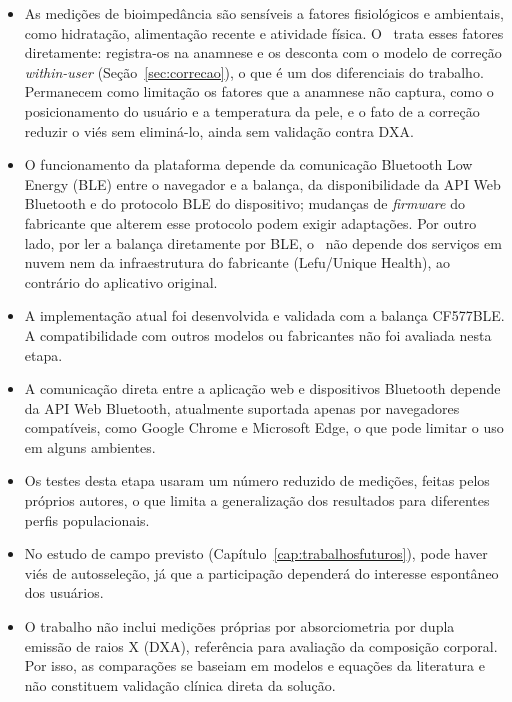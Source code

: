 \begin{itemize}
    \item As medições de bioimpedância são sensíveis a fatores fisiológicos e ambientais,
    como hidratação, alimentação recente e atividade física. O \sintonia\ trata esses
    fatores diretamente: registra-os na anamnese e os desconta com o modelo de correção
    \emph{within-user} (Seção~\ref{sec:correcao}), o que é um dos diferenciais do trabalho.
    Permanecem como limitação os fatores que a anamnese não captura, como o posicionamento
    do usuário e a temperatura da pele, e o fato de a correção reduzir o viés sem
    eliminá-lo, ainda sem validação contra DXA.

    \item O funcionamento da plataforma depende da comunicação Bluetooth Low Energy (BLE)
    entre o navegador e a balança, da disponibilidade da API Web Bluetooth e do protocolo
    BLE do dispositivo; mudanças de \emph{firmware} do fabricante que alterem esse protocolo
    podem exigir adaptações. Por outro lado, por ler a balança diretamente por BLE, o
    \sintonia\ não depende dos serviços em nuvem nem da infraestrutura do fabricante
    (Lefu/Unique Health), ao contrário do aplicativo original.

    \item A implementação atual foi desenvolvida e validada com a balança CF577BLE. A
    compatibilidade com outros modelos ou fabricantes não foi avaliada nesta etapa.

    \item A comunicação direta entre a aplicação web e dispositivos Bluetooth depende da API
    Web Bluetooth, atualmente suportada apenas por navegadores compatíveis, como Google
    Chrome e Microsoft Edge, o que pode limitar o uso em alguns ambientes.

    \item Os testes desta etapa usaram um número reduzido de medições, feitas pelos próprios
    autores, o que limita a generalização dos resultados para diferentes perfis
    populacionais.

    \item No estudo de campo previsto (Capítulo~\ref{cap:trabalhosfuturos}), pode haver viés
    de autosseleção, já que a participação dependerá do interesse espontâneo dos usuários.

    \item O trabalho não inclui medições próprias por absorciometria por dupla emissão de
    raios X (DXA), referência para avaliação da composição corporal. Por isso, as
    comparações se baseiam em modelos e equações da literatura e não constituem validação
    clínica direta da solução.


\end{itemize}
